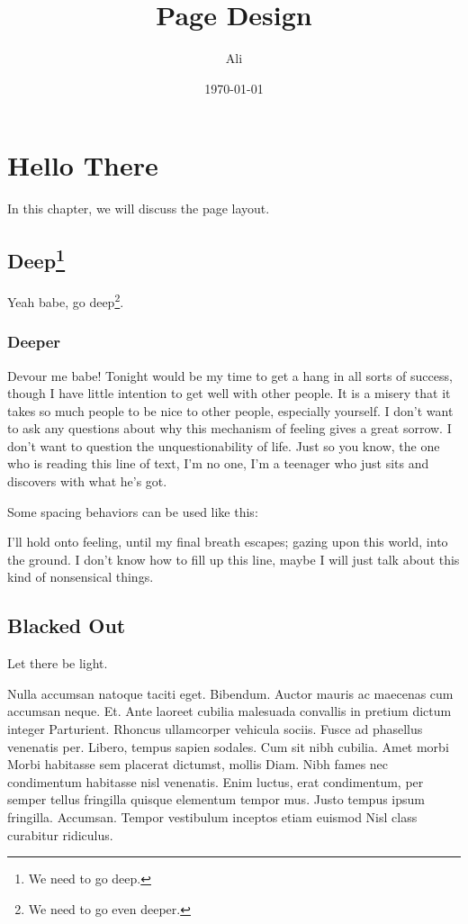 \documentclass{book}
\begin{document}
    
    \title{Page Design}
    \author{Ali}
    \date{\today}
    \maketitle
    \sffamily

    \tableofcontents

    \chapter[Introduction]{Hello There}
    In this chapter, we will discuss the page layout.
    \section[We need to go deep]{Deep\protect\footnote{We need to go deep.}}
    Yeah babe, go deep\footnote{We need to go even deeper.}.
    \subsection[Where are all the condoms?]{Deeper}
    Devour me babe! Tonight would be my time to get a hang in all sorts of success, though I have little intention to
    get well with other people. It is a misery that it takes so much people to be nice to other people, especially yourself.
    I don't want to ask any questions about why this mechanism of feeling gives a great sorrow. I don't want to question
    the unquestionability of life. Just so you know, the one who is reading this line of text, I'm no one, I'm a teenager
    who just sits and discovers with what he's got.

    Some spacing behaviors can be used like this:
    \begin{spacing}{2.5}
        I'll hold onto feeling, until my final breath escapes; gazing upon this world, into the ground. I don't know how to 
        fill up this line, maybe I will just talk about this kind of nonsensical things.
    \end{spacing}

    \pagebreak


    \section*{Blacked Out}
    Let there be light.


Nulla accumsan natoque taciti eget. Bibendum. Auctor mauris ac maecenas cum accumsan neque. Et. Ante laoreet cubilia malesuada convallis in pretium dictum integer Parturient. Rhoncus ullamcorper vehicula sociis. Fusce ad phasellus venenatis per. Libero, tempus sapien sodales. Cum sit nibh cubilia. Amet morbi Morbi habitasse sem placerat dictumst, mollis Diam. Nibh fames nec condimentum habitasse nisl venenatis. Enim luctus, erat condimentum, per semper tellus fringilla quisque elementum tempor mus. Justo tempus ipsum fringilla. Accumsan. Tempor vestibulum inceptos etiam euismod Nisl class curabitur ridiculus.
\end{document}
